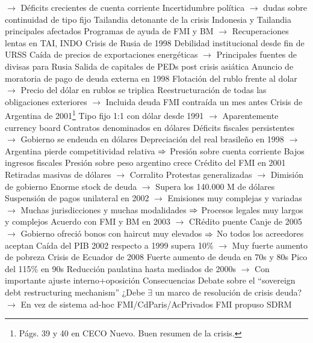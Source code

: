 \documentclass{nuevotema}
\begin{document}
\begin{esquemal}
				\4[] $\to$ Déficits crecientes de cuenta corriente
				\4[] Incertidumbre política
				\4[] $\to$ dudas sobre continuidad de tipo fijo
				\4[] Tailandia detonante de la crisis
				\4[] Indonesia y Tailandia principales afectados
				\4[] Programas de ayuda de FMI y BM
				\4[] $\to$ Recuperaciones lentas en TAI, INDO
				\4 Crisis de Rusia de 1998
				\4[] Debilidad institucional desde fin de URSS
				\4[] Caída de precios de exportaciones energéticas
				\4[] $\to$ Principales fuentes de divisas para Rusia
				\4[] Salida de capitales de PEDs post crisis asiática
				\4[] Anuncio de moratoria de pago de deuda externa en 1998
				\4[] Flotación del rublo frente al dolar
				\4[] $\to$ Precio del dólar en rublos se triplica
				\4[] Reestructuración de todas las obligaciones exteriores
				\4[] $\to$ Incluida deuda FMI contraída un mes antes
				\4 Crisis de Argentina de 2001\footnote{Págs. 39 y 40 en CECO Nuevo. Buen resumen de la crisis.}
				\4[] Tipo fijo 1:1 con dólar desde 1991
				\4[] $\to$ Aparentemente currency board
				\4[] Contratos denominados en dólares
				\4[] Déficits fiscales persistentes
				\4[] $\to$ Gobierno se endeuda en dólares
				\4[] Depreciación del real brasileño en 1998
				\4[] $\to$ Argentina pierde competitividad relativa
				\4[] $\Rightarrow$ Presión sobre cuenta corriente
				\4[] Bajos ingresos fiscales
				\4[] Presión sobre peso argentino crece
				\4[] Crédito del FMI en 2001
				\4[] Retiradas masivas de dólares
				\4[] $\to$ Corralito
				\4[] Protestas generalizadas
				\4[] $\to$ Dimisión de gobierno
				\4[] Enorme stock de deuda
				\4[] $\to$ Supera los 140.000 M de dólares
				\4[] Suspensión de pagos unilateral en 2002
				\4[] $\to$ Emisiones muy complejas y variadas
				\4[] $\to$ Muchas jurisdicciones y muchas modalidades
				\4[] $\Rightarrow$ Procesos legales muy largos y complejos
				\4[] Acuerdo con FMI y BM en 2003
				\4[] $\to$ CRédito puente
				\4[] Canje de 2005
				\4[] $\to$ Gobierno ofreció bonos con haircut muy elevados
				\4[] $\Rightarrow$ No todos los acreedores aceptan
				\4[] Caída del PIB 2002 respecto a 1999 supera 10\%
				\4[] $\to$ Muy fuerte aumento de pobreza
				\4 Crisis de Ecuador de 2008
				\4[] Fuerte aumento de deuda en 70s y 80s
				\4[] Pico del 115\% en 90s
				\4[] Reducción paulatina hasta mediados de 2000s
				\4[] $\to$ Con importante ajuste interno+oposición
			\3 Consecuencias
				\4 Debate sobre el ``sovereign debt restructuring mechanism''
				\4[] ¿Debe $\exists$ un marco de resolución de crisis deuda?
				\4[] $\to$ En vez de sistema ad-hoc FMI/CdParis/AcPrivados
				\4[] FMI propuso SDRM

\end{esquemal}
\end{document}

